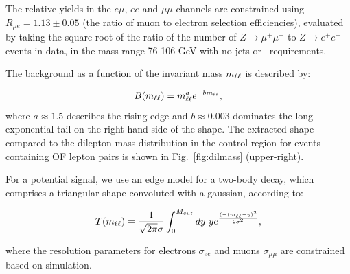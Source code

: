 The relative yields in the $e\mu$, $ee$ and $\mu\mu$ channels are constrained
using $R_{\mu e} = 1.13 \pm 0.05$ (the ratio of muon to electron selection efficiencies),
evaluated by taking the square root of the ratio of the number of 
$Z \to \mu^+\mu^-$ to $Z \to e^+e^-$ events in data, in the mass range 76-106 GeV with no jets or 
\met\ requirements. 
 
The background as a function of the invariant mass $m_{\ell\ell}$ is described by:

\begin{equation}
B(m_{\ell\ell}) = m_{\ell\ell}^a e^{-b m_{\ell\ell}},
\end{equation}
where $a\approx1.5$ describes the rising edge and $b\approx0.003$
dominates the long exponential tail on the right hand side of the 
shape. The extracted shape compared to the dilepton mass distribution in the control region
for events containing OF lepton pairs is shown in Fig.~\ref{fig:dilmass} (upper-right).

For a potential signal, we use an edge model for a two-body decay, 
which comprises a triangular shape convoluted with a gaussian,
according to:

\begin{equation}
T(m_{\ell\ell}) = \frac{1}{\sqrt{2\pi}\sigma}\int_0^{M_{cut}} dy~y e^{\frac{(-(m_{\ell\ell}-y)^2}{2\sigma^2}},
\end{equation}

where the resolution parameters for electrons $\sigma_{ee}$ and muons $\sigma_{\mu\mu}$ are constrained 
based on simulation.

